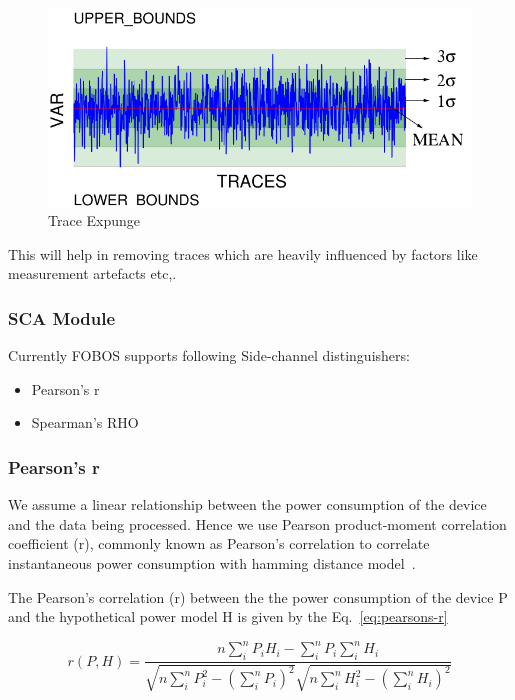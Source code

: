 \documentclass{llncs}
\numberwithin{algorithm}{chapter}
\begin{document}
\begin{figure}[ht]
\begin{center}
\includegraphics[scale=0.6]{figures/traceExpungMod}
\caption{\label{fig:tex}Trace Expunge}
\end{center} 
\vspace{-3ex}
\end{figure}

This will help in removing traces which are heavily influenced by factors like measurement artefacts etc,.

\subsubsection{SCA Module}
Currently FOBOS supports following Side-channel distinguishers:
\begin{itemize}
\item Pearson's r
\item Spearman's RHO
\end{itemize}
\subsubsection{Pearson's r}
We assume a linear relationship between the power consumption of the device
and the data being processed. Hence we use Pearson product-moment correlation
coefficient (r), commonly known as Pearson's correlation to correlate instantaneous power
consumption with hamming distance model~\cite{1203}.

The Pearson's correlation (r) between the the power consumption of the device P and the
hypothetical power model H is given by the Eq.~\ref{eq:pearsons-r}

\begin{equation}\label{eq:pearsons-r}
r(P,H) =\frac{n \sum_{i}^{n}{P_iH_i}-\sum_{i}^{n} P_i\sum_{i}^{n}H_i}{\sqrt{n\sum_{i}^{n} 
	      P_i^2-(\sum_{i}^{n} P_i)^2}\sqrt {n\sum_{i}^{n} H_i^2-(\sum_{i}^{n} H_i)^2}}
\end{equation}   
\end{document}
